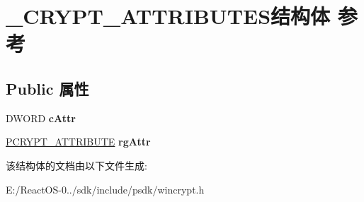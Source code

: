 \hypertarget{struct___c_r_y_p_t___a_t_t_r_i_b_u_t_e_s}{}\section{\+\_\+\+C\+R\+Y\+P\+T\+\_\+\+A\+T\+T\+R\+I\+B\+U\+T\+E\+S结构体 参考}
\label{struct___c_r_y_p_t___a_t_t_r_i_b_u_t_e_s}
\subsection*{Public 属性}
\begin{DoxyCompactItemize}
\item 
\mbox{\label{struct___c_r_y_p_t___a_t_t_r_i_b_u_t_e_s_a2c32e3182011c1cf35ee339ea9ed70de}} 
D\+W\+O\+RD {\bfseries c\+Attr}
\item 
\mbox{\label{struct___c_r_y_p_t___a_t_t_r_i_b_u_t_e_s_af1293b8601139aeefbe0fee41469cedd}} 
\hyperlink{struct___c_r_y_p_t___a_t_t_r_i_b_u_t_e}{P\+C\+R\+Y\+P\+T\+\_\+\+A\+T\+T\+R\+I\+B\+U\+TE} {\bfseries rg\+Attr}
\end{DoxyCompactItemize}


该结构体的文档由以下文件生成\+:\begin{DoxyCompactItemize}
\item 
E\+:/\+React\+O\+S-\/0../sdk/include/psdk/wincrypt.\+h\end{DoxyCompactItemize}
